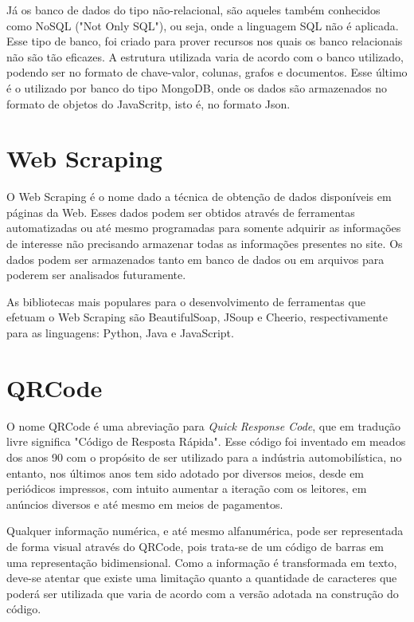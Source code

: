 Já os banco de dados do tipo não-relacional, são aqueles também conhecidos como NoSQL ("Not Only SQL"), ou seja, onde a linguagem SQL não é aplicada. Esse tipo de banco, foi criado para prover recursos nos quais os banco relacionais não são tão eficazes. A estrutura utilizada varia de acordo com o banco utilizado, podendo ser no formato de chave-valor, colunas, grafos e documentos. Esse último é o utilizado por banco do tipo MongoDB, onde os dados são armazenados no formato de objetos do JavaScritp, isto é, no formato Json.

\section{Web Scraping}

O Web Scraping é o nome dado a técnica de obtenção de dados disponíveis em páginas da Web. Esses dados podem ser obtidos através de ferramentas automatizadas ou até mesmo programadas para somente adquirir as informações de interesse não precisando armazenar todas as informações presentes no site.
Os dados podem ser armazenados tanto em banco de dados ou em arquivos para poderem ser analisados futuramente.

As bibliotecas mais populares para o desenvolvimento de ferramentas que efetuam o Web Scraping são BeautifulSoap, JSoup e Cheerio, respectivamente para as linguagens: Python, Java e JavaScript.

\section{QRCode}

O nome QRCode é uma abreviação para \textit{Quick Response Code}, que em tradução livre significa "Código de Resposta Rápida". Esse código foi inventado em meados dos anos 90 com o propósito de ser utilizado para a indústria automobilística, no entanto, nos últimos anos tem sido adotado por diversos meios, desde em periódicos impressos, com intuito aumentar a iteração com os leitores, em anúncios diversos e até mesmo em meios de pagamentos.

Qualquer informação numérica, e até mesmo alfanumérica, pode ser representada de forma visual através do QRCode, pois trata-se de um código de barras em uma representação bidimensional. Como a informação é transformada em texto, deve-se atentar que existe uma limitação quanto a quantidade de caracteres que poderá ser utilizada que varia de acordo com a versão adotada na construção do código.

